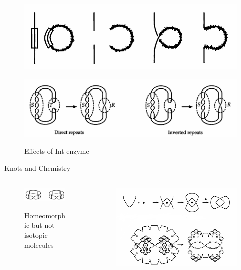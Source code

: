 \begin{frame}
	\begin{figure}
		\centering
		\includegraphics[width=0.6\linewidth]{images/inten.png}
		\label{inten}
	\end{figure}
	\begin{figure}
		\centering
		\includegraphics[width=0.75\linewidth]{images/inten2.png}
		\caption{Effects of Int enzyme}
		\label{inten2}
		\cite{adams2004knot}
	\end{figure}   
\end{frame}
\begin{frame}{Knots and Chemistry}
	\begin{columns}[T]
		\begin{column}{.48\textwidth}
			\begin{figure}
				\centering
				\includegraphics[width=0.8\linewidth]{images/mobius.png}
				\caption{Homeomorphic but not isotopic \centering molecules}
				\label{mobius}
				\cite{adams2004knot}
			\end{figure}
		\end{column} 
		\begin{column}{.48\textwidth}
			\begin{figure}
				\centering
				\includegraphics[width=0.9\linewidth]{images/mergedmolecule.png}
				\label{merged}
				\cite{adams2004knot}
			\end{figure}
		\end{column}
	\end{columns}
\end{frame}
